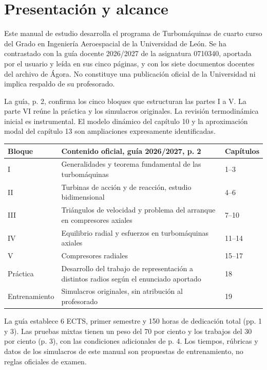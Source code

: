 \documentclass[10pt,openany]{book}
\begin{document}
\frontmatter
\studiumreadingguide
\chapter*{Presentación y alcance}
Este manual de estudio desarrolla el programa de Turbomáquinas de cuarto curso del Grado en Ingeniería Aeroespacial de la Universidad de León. Se ha contrastado con la guía docente 2026/2027 de la asignatura 0710340, aportada por el usuario y leída en sus cinco páginas, y con los siete documentos docentes del archivo de Ágora. No constituye una publicación oficial de la Universidad ni implica respaldo de su profesorado.

La guía, p. 2, confirma los cinco bloques que estructuran las partes I a V. La parte VI reúne la práctica y los simulacros originales. La revisión termodinámica inicial es instrumental. El modelo dinámico del capítulo 10 y la aproximación modal del capítulo 13 son ampliaciones expresamente identificadas.

\begin{longtable}{p{.16\linewidth}p{.50\linewidth}p{.20\linewidth}}
\textbf{Bloque} & \textbf{Contenido oficial, guía 2026/2027, p. 2} & \textbf{Capítulos}\\\hline
I & Generalidades y teorema fundamental de las turbomáquinas & 1--3\\
II & Turbinas de acción y de reacción, estudio bidimensional & 4--6\\
III & Triángulos de velocidad y problema del arranque en compresores axiales & 7--10\\
IV & Equilibrio radial y esfuerzos en turbomáquinas axiales & 11--14\\
V & Compresores radiales & 15--17\\
Práctica & Desarrollo del trabajo de representación a distintos radios según el enunciado aportado & 18\\
Entrenamiento & Simulacros originales, sin atribución al profesorado & 19\\
\end{longtable}
La guía establece 6 ECTS, primer semestre y 150 horas de dedicación total (pp. 1 y 3). Las pruebas mixtas tienen un peso del 70 por ciento y los trabajos del 30 por ciento (p. 3), con las condiciones adicionales de p. 4. Los tiempos, rúbricas y datos de los simulacros de este manual son propuestas de entrenamiento, no reglas oficiales de examen.
\end{document}

